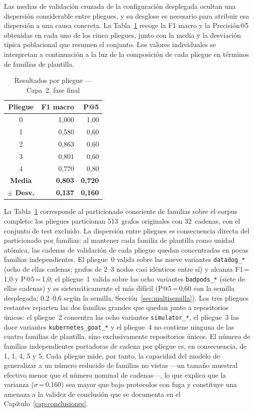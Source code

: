 Las medias de validación cruzada de la configuración desplegada ocultan una
dispersión considerable entre pliegues, y su desglose es necesario para atribuir
esa dispersión a una causa concreta. La Tabla~\ref{tab:gnn_folds} recoge la F1
macro y la Precisión@5 obtenidas en cada uno de los cinco pliegues, junto con la
media y la desviación típica poblacional que resumen el conjunto. Los valores
individuales se interpretan a continuación a la luz de la composición de cada
pliegue en términos de familias de plantilla.

\begin{table}[htbp]
\centering
\caption{Resultados por pliegue — Capa~2, fase final}
\label{tab:gnn_folds}
\begin{tabular}{@{}crr@{}}
\toprule
Pliegue & F1 macro & P@5 \\
\midrule
0 & 1,000 & 1,00 \\
1 & 0,580 & 0,60 \\
2 & 0,863 & 0,60 \\
3 & 0,801 & 0,60 \\
4 & 0,770 & 0,80 \\
\midrule
\textbf{Media} & \textbf{0,803} & \textbf{0,720} \\
\textbf{\(\pm\) Desv.} & \textbf{0,137} & \textbf{0,160} \\
\bottomrule
\end{tabular}
\fuentepropia
\end{table}

La Tabla~\ref{tab:gnn_folds} corresponde al particionado consciente de familias
sobre el corpus completo: los pliegues particionan 513~grafos originales con
32~cadenas, con el conjunto de test excluido.
La dispersión entre pliegues es consecuencia directa del particionado por
familias: al mantener cada familia de plantilla como unidad atómica, las cadenas
de validación de cada pliegue quedan concentradas en pocas familias
independientes. El pliegue~0 valida sobre las nueve variantes \texttt{datadog\_*}
(ocho de ellas cadenas; grafos de 2--3 nodos casi idénticos entre sí) y alcanza
F1\,=\,1,0 y P@5\,=\,1,0; el pliegue~1 valida sobre las ocho variantes
\texttt{badpods\_*} (siete de ellas cadenas) y
es sistemáticamente el más difícil (P@5\,=\,0,60 con la semilla desplegada;
0,2--0,6 según la semilla, Sección~\ref{sec:multisemilla}). Los tres pliegues
restantes reparten las dos familias grandes que quedan junto a repositorios
únicos: el pliegue~2 concentra las ocho variantes \texttt{simulator\_*}, el
pliegue~3 las doce variantes \texttt{kubernetes\_goat\_*} y el pliegue~4 no
contiene ninguna de las cuatro familias de plantilla, sino exclusivamente
repositorios únicos. El número de familias independientes portadoras de cadena
por pliegue es, en consecuencia, de 1, 1, 4, 5 y 5. Cada pliegue mide, por tanto,
la capacidad del modelo de generalizar a un número reducido de familias no vistas
—un tamaño muestral efectivo menor que el número nominal de cadenas\mbox{—,} lo que
explica que la varianza
(\(\sigma\)\,=\,0,160) sea mayor que bajo protocolos con fuga y constituye una
amenaza a la validez de conclusión que se documenta en el
Capítulo~\ref{cap:conclusiones}.

